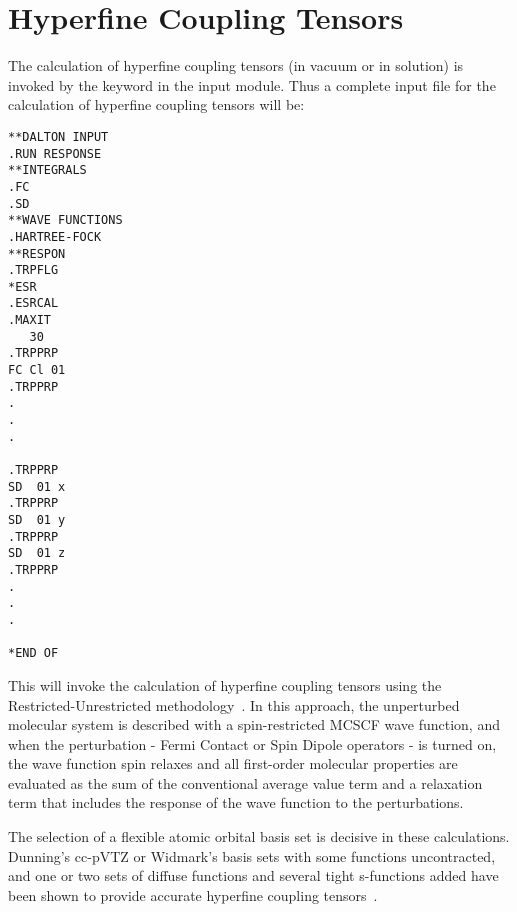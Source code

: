 \section{Hyperfine Coupling Tensors}

\begin{center}
\end{center}

    The calculation of hyperfine coupling tensors (in vacuum or in
solution) is invoked by the keyword  in the 
input module. Thus a complete input file for the calculation of
hyperfine coupling tensors will be:

\begin{verbatim}
**DALTON INPUT
.RUN RESPONSE
**INTEGRALS
.FC
.SD
**WAVE FUNCTIONS
.HARTREE-FOCK
**RESPON
.TRPFLG
*ESR
.ESRCAL
.MAXIT
   30
.TRPPRP
FC Cl 01
.TRPPRP
.
.
.

.TRPPRP
SD  01 x
.TRPPRP
SD  01 y
.TRPPRP
SD  01 z
.TRPPRP
.
.
.

*END OF
\end{verbatim}

    This will invoke the calculation of hyperfine
coupling tensors
using the Restricted-Unrestricted
methodology~\cite{bfpjjbjothhjajjcp97}. In this approach, the
unperturbed molecular system is described with a spin-restricted MCSCF
wave function, and when the perturbation - Fermi Contact or Spin Dipole
operators - is turned on, the wave function spin relaxes and all
first-order molecular properties are evaluated as the sum of the
conventional average value term and a relaxation term that includes
the response of the wave function to the perturbations.

    The selection of a flexible atomic orbital basis set is decisive
in these calculations. Dunning's cc-pVTZ or Widmark's basis sets with some
functions uncontracted, and one or two sets of diffuse functions and
several tight s-functions added have been shown to provide accurate
hyperfine coupling tensors~\cite{bfpjcpl232}.


